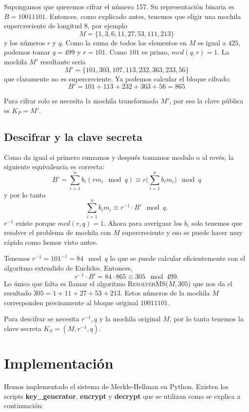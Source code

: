 \documentclass[12pt]{article}
\newenvironment{example}[1][Ejemplo]{\begin{trivlist}
\item[\hskip \labelsep {\bfseries #1}]}{\end{trivlist}}
\begin{document}
\begin{example}
Supongamos que queremos cifrar el número 157. Su representación binaria es $B = 10011101$. Entonces, como explicado antes, tenemos que eligir una mochila supercreciente de longitud $8$, por ejemplo
$$M = \{1, 3, 6, 11, 27, 53, 111, 213\}$$
y los números $r$ y $q$. Como la suma de todos los elementos en $M$ es igual a $425$, podemos tomar $q = 499$ y $r = 101$. Como $101$ es primo, $mcd(q,r) = 1$. La mochila $M'$ resultante sería
$$M' = \{101, 303, 107, 113, 232, 363, 233, 56\}$$
que claramente no es supercreciente. Ya podemos calcular el bloque cifrado:
$$B' = 101 + 113 + 232 + 363 + 56 = 865$$
\end{example}
Para cifrar solo se necesita la mochila transformada $M'$, por eso la clave pública es $K_P = M'$.

\subsection*{Descifrar y la clave secreta}
Como da igual si primero sumamos y después tomamos modulo o al revés, la siguiente equivalencia es correcta:
$$B' = \sum_{i=1}^nb_i(rm_i \mod q) \equiv r\big(\sum_{i=1}^nb_im_i\big)\mod q$$
y por lo tanto
$$\sum_{i=1}^nb_im_i \equiv r^{-1} \cdot B' \mod q.$$
$r^{-1}$ existe porque $mcd(r,q) = 1$. Ahora para averiguar los $b_i$ solo tenemos que resolver el problema de mochila con $M$ supercreciente y eso se puede hacer muy rápido como hemos visto antes.

\begin{example}
Tenemos $r^{-1} = 101^{-1}= 84 \mod q$ lo que se puede calcular eficientemente con el algoritmo extendido de Euclides. Entonces,
$$r^{-1} \cdot B' = 84 \cdot 865 \equiv 305 \mod 499.$$
Lo único que falta es llamar el algoritmo \textsc{ResolverMS}($M, 305$) que nos da el resultado $305 = 1 + 11 + 27 + 53 + 213$. Estos números de la mochila $M$ corresponden precisamente al bloque original $10011101$.
\end{example}
Para descifrar se necesita $r^{-1}, q$ y la mochila original $M$, por lo tanto tenemos la clave secreta $K_S = (M, r^{-1}, q)$.

\section{Implementación}

Hemos implementado el sistema de Merkle-Hellman en Python. Existen los scripts \textbf{key\_generator}, \textbf{encrypt} y \textbf{decrypt} que se utilizan como se explica a continuación:
\end{document}
